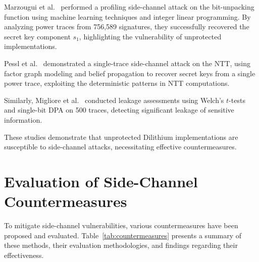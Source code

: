 Marzougui et al.~\cite{Marzougui22} performed a profiling side-channel attack on the bit-unpacking function using machine learning techniques and integer linear programming. By analyzing power traces from 756,589 signatures, they successfully recovered the secret key component $s_1$, highlighting the vulnerability of unprotected implementations.

Pessl et al.~\cite{Pessl19} demonstrated a single-trace side-channel attack on the NTT, using factor graph modeling and belief propagation to recover secret keys from a single power trace, exploiting the deterministic patterns in NTT computations.

Similarly, Migliore et al.~\cite{Migliore19} conducted leakage assessments using Welch's $t$-tests and single-bit \ac{DPA} on 500 traces, detecting significant leakage of sensitive information.

These studies demonstrate that unprotected Dilithium implementations are susceptible to side-channel attacks, necessitating effective countermeasures.


\section{Evaluation of Side-Channel Countermeasures}

To mitigate side-channel vulnerabilities, various countermeasures have been proposed and evaluated. Table~\ref{tab:countermeasures} presents a summary of these methods, their evaluation methodologies, and findings regarding their effectiveness.

